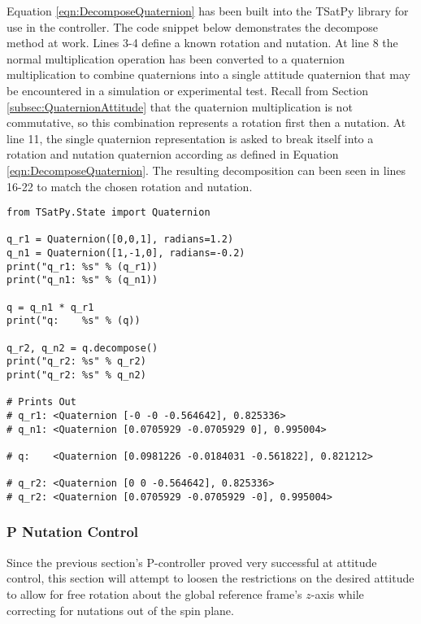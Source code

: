 Equation \ref{eqn:DecomposeQuaternion} has been built into the TSatPy library for use in the controller.  The code snippet below demonstrates the decompose method at work.  Lines 3-4 define a known rotation and nutation.  At line 8 the normal multiplication operation has been converted to a quaternion multiplication to combine quaternions into a single attitude quaternion that may be encountered in a simulation or experimental test.  Recall from Section \ref{subsec:QuaternionAttitude} that the quaternion multiplication is not commutative, so this combination represents a rotation first then a nutation.  At line 11, the single quaternion representation is asked to break itself into a rotation and nutation quaternion according as defined in Equation \ref{eqn:DecomposeQuaternion}.  The resulting decomposition can been seen in lines 16-22 to match the chosen rotation and nutation.

\begin{singlespace}
  \begin{verbatim}
from TSatPy.State import Quaternion

q_r1 = Quaternion([0,0,1], radians=1.2)
q_n1 = Quaternion([1,-1,0], radians=-0.2)
print("q_r1: %s" % (q_r1))
print("q_n1: %s" % (q_n1))

q = q_n1 * q_r1
print("q:    %s" % (q))

q_r2, q_n2 = q.decompose()
print("q_r2: %s" % q_r2)
print("q_r2: %s" % q_n2)

# Prints Out
# q_r1: <Quaternion [-0 -0 -0.564642], 0.825336>
# q_n1: <Quaternion [0.0705929 -0.0705929 0], 0.995004>

# q:    <Quaternion [0.0981226 -0.0184031 -0.561822], 0.821212>

# q_r2: <Quaternion [0 0 -0.564642], 0.825336>
# q_r2: <Quaternion [0.0705929 -0.0705929 -0], 0.995004>
  \end{verbatim}
\nocite{minted}
\end{singlespace}


\subsubsection{P Nutation Control}
\label{subsubsec:PNutationControl}

Since the previous section's P-controller proved very successful at attitude control, this section will attempt to loosen the restrictions on the desired attitude to allow for free rotation about the global reference frame's $z$-axis while correcting for nutations out of the spin plane.


